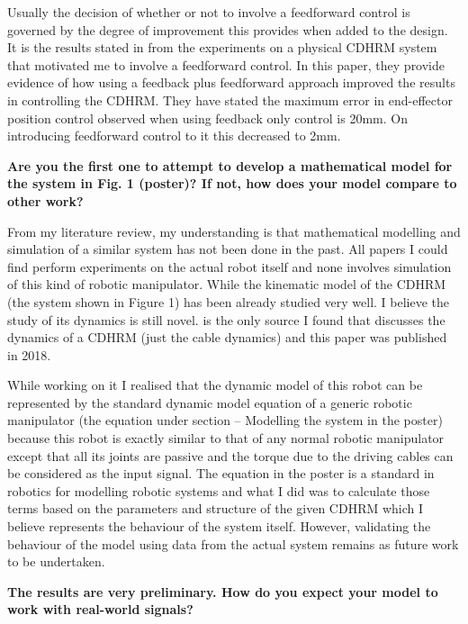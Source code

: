 \documentclass[a4paper,12pt]{article}
\begin{document}
Usually the decision of whether or not to involve a feedforward control is governed by the degree of improvement this provides when added to the design. It is the results stated in \cite{RN30} from the experiments on a physical CDHRM system that motivated me to involve a feedforward control. In this paper, they provide evidence of how using a feedback plus feedforward approach improved the results in controlling the CDHRM. They have stated the maximum error in end-effector position control observed when using feedback only control is 20mm. On introducing feedforward control to it this decreased to 2mm.

\hspace{10pt}

\textbf{Are you the first one to attempt to develop a mathematical model for the system in Fig. 1 (poster)? If not, how does your model compare to other work?}

From my literature review, my understanding is that mathematical modelling and simulation of a similar system has not been done in the past. All papers I could find perform experiments on the actual robot itself and none involves simulation of this kind of robotic manipulator. While the kinematic model of the CDHRM (the system shown in Figure 1) has been already studied very well. I believe the study of its dynamics is still novel. \cite{RN30} is the only source I found that discusses the dynamics of a CDHRM (just the cable dynamics) and this paper was published in 2018.

While working on it I realised that the dynamic model of this robot can be represented by the standard dynamic model equation of a generic robotic manipulator (the equation under section – Modelling the system in the poster) because this robot is exactly similar to that of any normal robotic manipulator except that all its joints are passive and the torque due to the driving cables can be considered as the input signal. The equation in the poster is a standard in robotics for modelling robotic systems and what I did was to calculate those terms based on the parameters and structure of the given CDHRM which I believe represents the behaviour of the system itself. However, validating the behaviour of the model using data from the actual system remains as future work to be undertaken.

\hspace{10pt}

\textbf{The results are very preliminary. How do you expect your model to work with real-world signals?}
\end{document}
